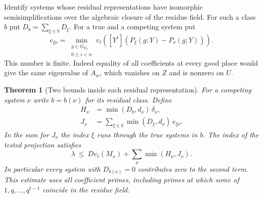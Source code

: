 \documentclass[a4paper,11pt]{article}
\newtheorem{theorem}[proposition]{Theorem}
\theoremstyle{definition}
\theoremstyle{remark}
\numberwithin{equation}{section}
\begin{document}
Identify systems whose residual representations have
isomorphic semisimplifications over the algebraic closure
of the residue field. For such a class \(b\) put
\(D_b=\sum_{\xi\in b}D_\xi\). For a true and a competing
system put
\[
 e_{\xi\nu}=\min_{\substack{g\in G_{E_x}\\0\le i<n}}
     v_\ell\!\left([Y^i](P_\xi(g;Y)-P_\nu(g;Y))\right).
\]
This number is finite. Indeed equality of all coefficients
at every good place would give the same eigenvalue of
\(A_w\), which vanishes on \(Z\) and is nonzero on \(U\).

\begin{theorem}[Two bounds inside each residual representation]
\leavevmode\label{thm:residualflag786}
For a competing system \(\nu\) write \(b=b(\nu)\) for its
residual class. Define
\[
\begin{aligned}
   H_\nu&=\min(D_b,d_\nu)\,\delta_\nu,\\
   J_\nu&=\sum_{\xi\in b}\min(D_\xi,d_\nu)\,e_{\xi\nu}.
\end{aligned}
\]
In the sum for \(J_\nu\) the index \(\xi\) runs through
the true systems in \(b\). The index of the tested
projection satisfies
\[
        \lambda\ \le\ Dv_\ell(M_x)
                      +\sum_{\nu}\min(H_\nu,J_\nu).
\]
In particular every system with \(D_{b(\nu)}=0\)
contributes zero to the second term. This estimate
uses all coefficient primes, including primes at
which some of \(1,q,\ldots,q^{t-1}\) coincide in the
residue field.
\end{theorem}
\end{document}
